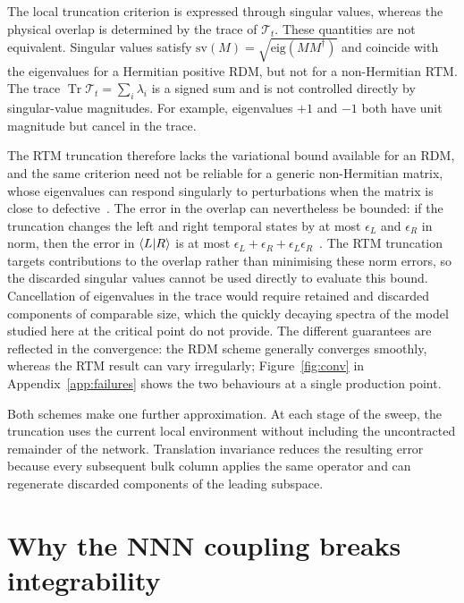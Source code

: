 The local truncation criterion is expressed through singular values, whereas the physical overlap is determined by the trace of $\mathcal{T}_t$. These quantities are not equivalent. Singular values satisfy $\mathrm{sv}(M)=\sqrt{\mathrm{eig}(MM^{\dagger})}$ and coincide with the eigenvalues for a Hermitian positive \ac{RDM}, but not for a non-Hermitian \ac{RTM}. The trace $\operatorname{Tr}\mathcal{T}_t=\sum_i\lambda_i$ is a signed sum and is not controlled directly by singular-value magnitudes. For example, eigenvalues $+1$ and $-1$ both have unit magnitude but cancel in the trace.

The \ac{RTM} truncation therefore lacks the variational bound available for an \ac{RDM}, and the same criterion need not be reliable for a generic non-Hermitian matrix, whose eigenvalues can respond singularly to perturbations when the matrix is close to defective~\cite{moro1997}. The error in the overlap can nevertheless be bounded: if the truncation changes the left and right temporal states by at most $\epsilon_L$ and $\epsilon_R$ in norm, then the error in $\braket{L}{R}$ is at most $\epsilon_L+\epsilon_R+\epsilon_L\epsilon_R$~\cite{hastings_mahajan2015}. The \ac{RTM} truncation targets contributions to the overlap rather than minimising these norm errors, so the discarded singular values cannot be used directly to evaluate this bound. Cancellation of eigenvalues in the trace would require retained and discarded components of comparable size, which the quickly decaying spectra of the model studied here at the critical point do not provide. The different guarantees are reflected in the convergence: the \ac{RDM} scheme generally converges smoothly, whereas the \ac{RTM} result can vary irregularly; Figure~\ref{fig:conv} in Appendix~\ref{app:failures} shows the two behaviours at a single production point.

Both schemes make one further approximation. At each stage of the sweep, the truncation uses the current local environment without including the uncontracted remainder of the network. Translation invariance reduces the resulting error because every subsequent bulk column applies the same operator and can regenerate discarded components of the leading subspace.

\FloatBarrier
\section{Why the NNN coupling breaks integrability}
\label{app:pairing}
\label{sec:annni:jw}

